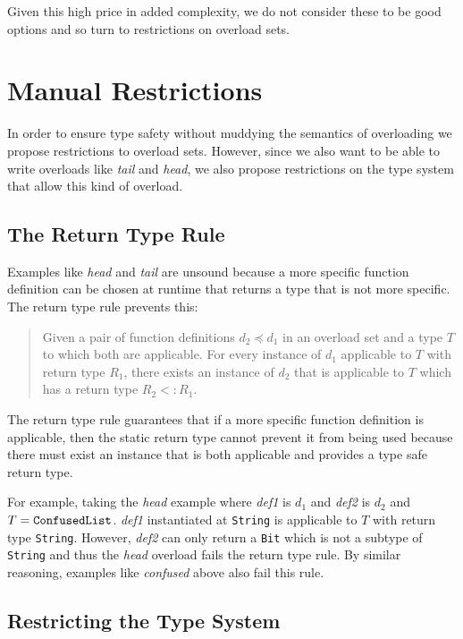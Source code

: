\documentclass[preprint]{sigplanconf}
\newcommand{\ms}{\preceq}
\begin{document}
Given this high price in added complexity, we do not consider these to be good options and so turn to
restrictions on overload sets.

\section{Manual Restrictions}

In order to ensure type safety without muddying the semantics of overloading we propose restrictions 
to overload sets.  However, since we also want to be able to write overloads like {\it tail} and {\it head},
we also propose restrictions on the type system that allow this kind of overload.

\subsection{The Return Type Rule}

Examples like {\it head} and {\it tail} are unsound because a more specific function definition can be chosen
at runtime that returns a type that is not more specific.  The return type rule prevents this: 

\begin{quote}Given a pair of function
definitions $d_2 \ms d_1$ in an overload set and a type $T$ to which both are applicable. For every instance
of $d_1$ applicable to $T$ with return type $R_1$, there exists an instance of $d_2$ that is applicable to $T$ which
has a return type $R_2 <: R_1$.  
\end{quote}

The return type rule guarantees that if a more specific function definition is applicable, then
the static return type cannot prevent it from being used because there must exist an instance that is both applicable
and provides a type safe return type.

For example, taking the {\it head} example where {\it def1} is $d_1$ and {\it def2} is $d_2$ and $T={\tt ConfusedList}$.
{\it def1} instantiated at {\tt String} is applicable to $T$ with return type {\tt String}.  However, {\it def2} can only return
a {\tt Bit} which is not a subtype of {\tt String} and thus the {\it head} overload fails the return type rule.  By similar
reasoning, examples like {\it confused} above also fail this rule.

\subsection{Restricting the Type System}
\end{document}
